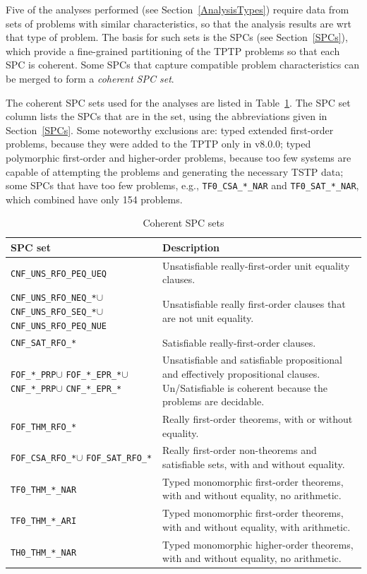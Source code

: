\documentclass[runningheads]{llncs}
\begin{document}
Five of the analyses performed (see Section~\ref{AnalysisTypes}) require data from sets of 
problems with similar characteristics, so that the analysis results are wrt that type of problem.
The basis for such sets is the SPCs (see Section~\ref{SPCs}), which provide a fine-grained 
partitioning of the TPTP problems so that each SPC is coherent.
Some SPCs that capture compatible problem characteristics can be merged to form a 
{\em coherent SPC set}.

The coherent SPC sets used for the analyses are listed in Table~\ref{SPCSetsTable}.
The SPC set column lists the SPCs that are in the set, using the abbreviations given in 
Section~\ref{SPCs}.
Some noteworthy exclusions are:
typed extended first-order problems, because they were added to the TPTP only in v8.0.0;
typed polymorphic first-order and higher-order problems, because too few systems are 
capable of attempting the problems and generating the necessary TSTP data;
some SPCs that have too few problems, e.g., {\tt TF0\_CSA\_*\_NAR} and {\tt TF0\_SAT\_*\_NAR},
which combined have only 154 problems.

\begin{table}[h!]
\renewcommand{\arraystretch}{1.5}
\center
\begin{tabular}{p{3.5cm}|p{8.0cm}}
\hline
SPC set & Description \\
\hline
{\tt CNF\_UNS\_RFO\_PEQ\_UEQ} &
Unsatisfiable really-first-order unit equality clauses. \\
{\tt CNF\_UNS\_RFO\_NEQ\_*}\enspace$\cup$ {\tt CNF\_UNS\_RFO\_SEQ\_*}\enspace$\cup$
{\tt CNF\_UNS\_RFO\_PEQ\_NUE} &
Unsatisfiable really first-order clauses that are not unit equality. \\
{\tt CNF\_SAT\_RFO\_*} &
Satisfiable really-first-order clauses. \\
{\tt FOF\_*\_PRP}\enspace$\cup$ {\tt FOF\_*\_EPR\_*}\enspace$\cup$
{\tt CNF\_*\_PRP}\enspace$\cup$ {\tt CNF\_*\_EPR\_*} &
Unsatisfiable and satisfiable propositional and effectively propositional clauses.
Un/Satisfiable is coherent because the problems are decidable. \\
{\tt FOF\_THM\_RFO\_*} &
Really first-order theorems, with or without equality. \\
{\tt FOF\_CSA\_RFO\_*}\enspace$\cup$ {\tt FOF\_SAT\_RFO\_*} &
Really first-order non-theorems and satisfiable sets, with and without equality. \\
{\tt TF0\_THM\_*\_NAR} &
Typed monomorphic first-order theorems, with and without equality, no arithmetic. \\
{\tt TF0\_THM\_*\_ARI} &
Typed monomorphic first-order theorems, with and without equality, with arithmetic. \\
{\tt TH0\_THM\_*\_NAR} &
Typed monomorphic higher-order theorems, with and without equality, no arithmetic. \\
\hline
\end{tabular}
\vspace*{0.5em}
\caption{Coherent SPC sets}
\label{SPCSetsTable}
\end{table}
\end{document}
